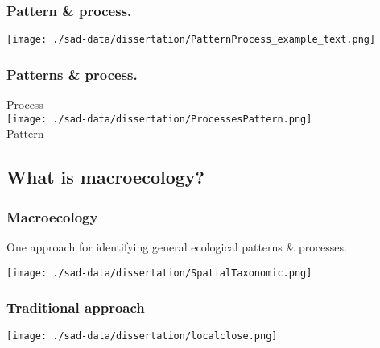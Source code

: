 \documentclass[14pt]{beamer}
\begin{document}
\begin{frame}
\frametitle{Pattern \& process.}
\begin{center}
\texttt{[image: ./sad-data/dissertation/PatternProcess\_example\_text.png]}\\
\end{center}
\end{frame}

\begin{frame}
\frametitle{Patterns \& process.}
\begin{Large}
\begin{center}
Process\\ 
\texttt{[image: ./sad-data/dissertation/ProcessesPattern.png]}\\
Pattern\\
\end{center}
\end{Large}
\end{frame}

\subsection{What is macroecology?}
\begin{frame}[t]
\frametitle{Macroecology}
\normalsize One approach for identifying general ecological patterns \& processes.
\begin{center}
\texttt{[image: ./sad-data/dissertation/SpatialTaxonomic.png]}
\end{center}
\end{frame}


\begin{frame}[t]
\frametitle{Traditional approach}
\vspace{-7pt}
\begin{center}
\texttt{[image: ./sad-data/dissertation/localclose.png]}
\end{center}
\end{frame}
\end{document}
